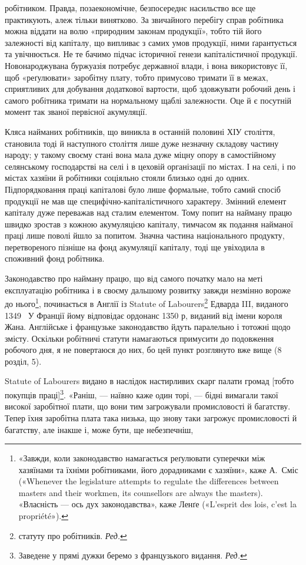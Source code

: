 \parcont{}  %
робітником. Правда, позаекономічне, безпосереднє насильство
все ще практикують, алеж тільки винятково. За звичайного
перебігу справ робітника можна віддати на волю «природним
законам продукції», тобто тій його залежності від капіталу,
що випливає з самих умов продукції, ними ґарантується та увічнюється.
Не те бачимо підчас історичної генези капіталістичної
продукції. Новонароджувана буржуазія потребує державної
влади, і вона використовує її, щоб «реґулювати» заробітну плату,
тобто примусово тримати її в межах, сприятливих для добування
додаткової вартости, щоб здовжувати робочий день і самого робітника
тримати на нормальному щаблі залежности. Оце й є
посутній момент так званої первісної акумуляції.

Кляса найманих робітників, що виникла в останній половині
ХІУ століття, становила тоді й наступного століття лише дуже
незначну складову частину народу; у такому своєму стані вона
мала дуже міцну опору в самостійному селянському господарстві
на селі і в цеховій організації по містах. І на селі, і по містах
хазяїни й робітники соціяльно стояли близько одні до одних.
Підпорядковання праці капіталові було лише формальне, тобто
самий спосіб продукції не мав ще специфічно-капіталістичного
характеру. Змінний елемент капіталу дуже переважав над сталим
елементом. Тому попит на найману працю швидко зростав
з кожною акумуляцією капіталу, тимчасом як подання найманої
праці лише поволі йшло за попитом. Значна частина національного
продукту, перетвореного пізніше на фонд акумуляції капіталу,
тоді ще увіходила в споживний фонд робітника.

Законодавство про найману працю, що від самого початку
мало на меті експлуатацію робітника і в своєму дальшому розвитку
завжди незмінно вороже до нього\footnote{
«Завжди, коли законодавство намагається реґулювати суперечки
між хазяїнами та їхніми робітниками, його дорадниками є хазяїни», каже
А.~Сміс («Whenever the legislature attempts to regulate the differences
between masters and their workmen, its counsellors are always the masters).
«Власність — ось дух законодавства», каже Ленґе («L’esprit des
lois, c’est la propriété»).
}, починається в Англії
із Statute of Labourers\footnote*{
статуту про робітників. \emph{Ред.}
} Едварда III, виданого 1349~ У Франції
йому відповідає ордонанс 1350 р, виданий від імени короля
Жана. Англійське і французьке законодавство йдуть паралельно
і тотожні щодо змісту. Оскільки робітничі статути намагаються
примусити до подовження робочого дня, я не повертаюся до них,
бо цей пункт розглянуто вже вище (8 розділ, 5).

Statute of Labourers видано в наслідок настирливих скарг
палати громад [тобто покупців праці]\footnote*{
Заведене у прямі дужки беремо з французького видання. \emph{Ред.}
}. «Раніш, — наївно каже
один торі, — бідні вимагали такої високої заробітної плати, що
вони тим загрожували промисловості й багатству. Тепер їхня
заробітна плата така низька, що знову таки загрожує промисловості
й багатству, але інакше і, може бути, ще небезпечніш,
\parbreak{}  %
